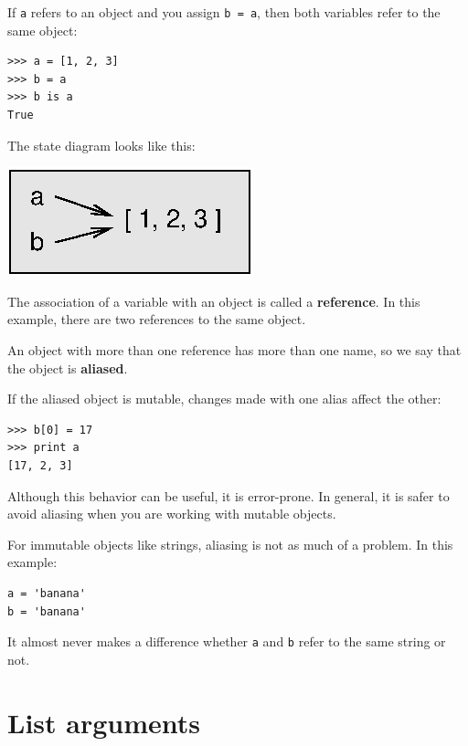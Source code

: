 \documentclass[10pt]{book}
\begin{document}

If {\tt a} refers to an object and you assign {\tt b = a},
then both variables refer to the same object:

\beforeverb
\begin{verbatim}
>>> a = [1, 2, 3]
>>> b = a
>>> b is a
True
\end{verbatim}
\afterverb
%
The state diagram looks like this:


\beforefig
\centerline{\includegraphics{figs/list3.eps}}
\afterfig

The association of a variable with an object is called a {\bf
reference}.  In this example, there are two references to the same
object.


An object with more than one reference has more
than one name, so we say that the object is {\bf aliased}.


If the aliased object is mutable, 
changes made with one alias affect
the other:

\beforeverb
\begin{verbatim}
>>> b[0] = 17
>>> print a
[17, 2, 3]
\end{verbatim}
\afterverb
%
Although this behavior can be useful, it is error-prone.  In general,
it is safer to avoid aliasing when you are working with mutable
objects.


For immutable objects like strings, aliasing is not as much of a
problem.  In this example:

\beforeverb
\begin{verbatim}
a = 'banana'
b = 'banana'
\end{verbatim}
\afterverb
%
It almost never makes a difference whether {\tt a} and {\tt b} refer
to the same string or not.


\section{List arguments}
\end{document}
